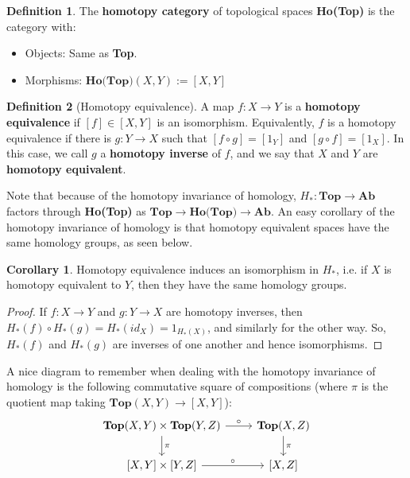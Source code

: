 \documentclass[11pt, oneside]{amsart}   	%
\theoremstyle{definition}
\newtheorem{definition}{Definition}[section]
\newtheorem{corollary}{Corollary}[theorem]
\begin{document}
\begin{definition}
	The \textbf{homotopy category} of topological spaces \textbf{Ho(Top)} is the category with:
	\begin{itemize}
		\item Objects: Same as \textbf{Top}.
		\item Morphisms: $\textbf{Ho(Top)}(X, Y) := [X, Y]$
	\end{itemize}
\end{definition}

\begin{definition}[Homotopy equivalence]
	A map $f : X\rightarrow Y$ is a \textbf{homotopy equivalence} if $[f]\in [X, Y]$ is an isomorphism. Equivalently, $f$ 
	is a homotopy equivalence if there is $g : Y\rightarrow X$ such that $[f\circ g] = [1_Y]$ and $[g\circ f] = [1_X]$. 
	In this case, we call $g$ a \textbf{homotopy inverse} of $f$, and we say that $X$ and $Y$ are \textbf{homotopy 
	equivalent}. 
\end{definition}

Note that because of the homotopy invariance of homology, $H_* : \textbf{Top}\rightarrow\textbf{Ab}$ factors through 
\textbf{Ho(Top)} as $\textbf{Top}\rightarrow\textbf{Ho(Top)}\rightarrow\textbf{Ab}$. An easy corollary of the homotopy 
invariance of homology is that homotopy equivalent spaces have the same homology groups, as seen below.

\begin{corollary}
	Homotopy equivalence induces an isomorphism in $H_*$, i.e. if $X$ is homotopy equivalent to $Y$, then they have the 
	same homology groups. 
\end{corollary}
\begin{proof}
	If $f : X\rightarrow Y$ and $g : Y\rightarrow X$ are homotopy inverses, then $H_*(f)\circ H_*(g) = H_*(id_X) = 
	1_{H_*(X)}$, and similarly for the other way. So, $H_*(f)$ and $H_*(g)$ are inverses of one another and hence 
	isomorphisms.
\end{proof}

A nice diagram to remember when dealing with the homotopy invariance of homology is the following commutative square 
of compositions (where $\pi$ is the quotient map taking $\textbf{Top}(X, Y)\rightarrow [X, Y]$):
\[\begin{tikzcd}
	\textbf{Top}(X, Y)\times\textbf{Top}(Y, Z)\arrow[d, "\pi"]\arrow[r, "\circ"] & \textbf{Top}(X, Z)\arrow[d, "\pi"] \\
	\left[X, Y\right]\times \left[Y, Z\right]\arrow[r, "\circ"] & \left[X, Z\right] \\
\end{tikzcd}\]
\end{document}
